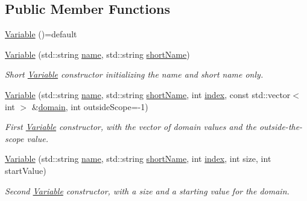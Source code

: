 \subsection*{Public Member Functions}
\begin{DoxyCompactItemize}
\item 
\hyperlink{classghost_1_1Variable_af68388a15c2b19251381dc5599a959bb}{Variable} ()=default
\item 
\hyperlink{classghost_1_1Variable_a6930aa1207effb3483b39b7dbceccd0a}{Variable} (std\-::string \hyperlink{classghost_1_1Variable_a0f9fbecc12e22224c65ed6d8ce4cb507}{name}, std\-::string \hyperlink{classghost_1_1Variable_af0a8a6632b981ae0ff22cf4dc62495d3}{short\-Name})
\begin{DoxyCompactList}\small\item\em Short \hyperlink{classghost_1_1Variable}{Variable} constructor initializing the name and short name only. \end{DoxyCompactList}\item 
\hyperlink{classghost_1_1Variable_acc4e6e1165210a30c59ae820fd6e95d5}{Variable} (std\-::string \hyperlink{classghost_1_1Variable_a0f9fbecc12e22224c65ed6d8ce4cb507}{name}, std\-::string \hyperlink{classghost_1_1Variable_af0a8a6632b981ae0ff22cf4dc62495d3}{short\-Name}, int \hyperlink{classghost_1_1Variable_a934efa463fb1897b4266040e321dbc41}{index}, const std\-::vector$<$ int $>$ \&\hyperlink{classghost_1_1Variable_a59a5fc42a83c3dd5504daa72f5191469}{domain}, int outside\-Scope=-\/1)
\begin{DoxyCompactList}\small\item\em First \hyperlink{classghost_1_1Variable}{Variable} constructor, with the vector of domain values and the outside-\/the-\/scope value. \end{DoxyCompactList}\item 
\hyperlink{classghost_1_1Variable_a3edfe1cde7f5958c841eacb6fa347ca4}{Variable} (std\-::string \hyperlink{classghost_1_1Variable_a0f9fbecc12e22224c65ed6d8ce4cb507}{name}, std\-::string \hyperlink{classghost_1_1Variable_af0a8a6632b981ae0ff22cf4dc62495d3}{short\-Name}, int \hyperlink{classghost_1_1Variable_a934efa463fb1897b4266040e321dbc41}{index}, int size, int start\-Value)
\begin{DoxyCompactList}\small\item\em Second \hyperlink{classghost_1_1Variable}{Variable} constructor, with a size and a starting value for the domain. \end{DoxyCompactList}\item 

\end{DoxyCompactItemize}
